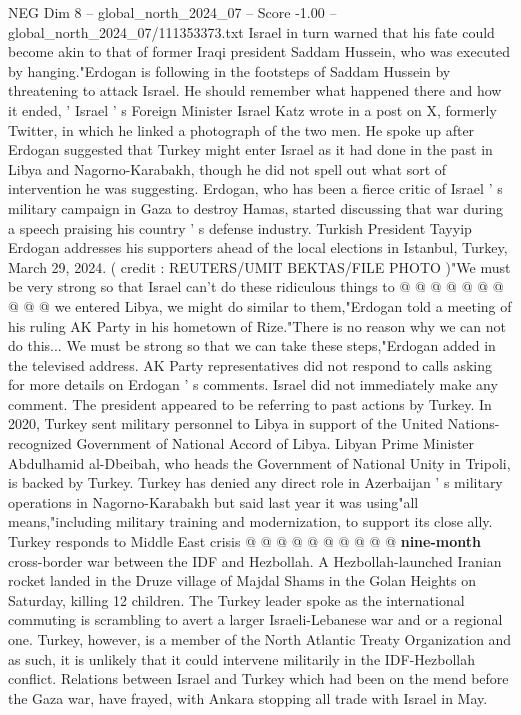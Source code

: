 \begin{textsample}{NEG Dim 8 – global\_north\_2024\_07 – Score -1.00 – global\_north\_2024\_07/111353373.txt}  \label{ex:f8_neg_187}
Israel in turn warned that his fate could become akin to that of former Iraqi president Saddam Hussein, who was executed by hanging."Erdogan is following in the footsteps of Saddam Hussein by threatening to attack Israel.
He should remember what happened there and how it ended, ' Israel ' s Foreign Minister Israel Katz wrote in a post on X, formerly Twitter, in which he linked a photograph of the two men.
He spoke up after Erdogan suggested that Turkey might enter Israel as it had done in the past in Libya and Nagorno-Karabakh, though he did not spell out what sort of intervention he was suggesting.
Erdogan, who has been a fierce critic of Israel ' s military campaign in Gaza to destroy Hamas, started discussing that war during a speech praising his country ' s defense industry.
Turkish President Tayyip Erdogan addresses his supporters ahead of the local elections in Istanbul, Turkey, March 29, 2024. ( credit : REUTERS/UMIT BEKTAS/FILE PHOTO )"We must be very strong so that Israel can't do these ridiculous things to @ @ @ @ @ @ @ @ @ @ we entered Libya, we might do similar to them,"Erdogan told a meeting of his ruling AK Party in his hometown of Rize."There is no reason why we can not do this...
We must be strong so that we can take these steps,"Erdogan added in the televised address.
AK Party representatives did not respond to calls asking for more details on Erdogan ' s comments.
Israel did not immediately make any comment.
The president appeared to be referring to past actions by Turkey.
In 2020, Turkey sent military personnel to Libya in support of the United Nations-recognized Government of National Accord of Libya.
Libyan Prime Minister Abdulhamid al-Dbeibah, who heads the Government of National Unity in Tripoli, is backed by Turkey.
Turkey has denied any direct role in Azerbaijan ' s military operations in Nagorno-Karabakh but said last year it was using"all means,"including military training and modernization, to support its close ally.
Turkey responds to Middle East crisis @ @ @ @ @ @ @ @ @ @ \textbf{nine-month} cross-border war between the IDF and Hezbollah.
A Hezbollah-launched Iranian rocket landed in the Druze village of Majdal Shams in the Golan Heights on Saturday, killing 12 children.
The Turkey leader spoke as the international commuting is scrambling to avert a larger Israeli-Lebanese war and or a regional one.
Turkey, however, is a member of the North Atlantic Treaty Organization and as such, it is unlikely that it could intervene militarily in the IDF-Hezbollah conflict.
Relations between Israel and Turkey which had been on the mend before the Gaza war, have frayed, with Ankara stopping all trade with Israel in May.

\end{textsample}
